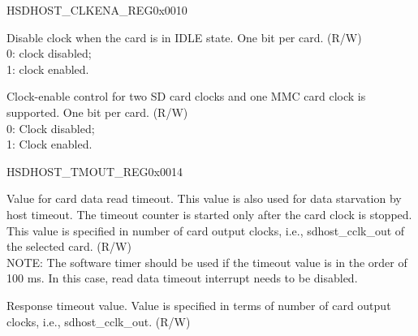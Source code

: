 \begin{register}{H}{SDHOST\_CLKENA\_REG}{0x{}0010}\label{regdesc:CLKENAREG}
%
%
%
%
\regnewline%
\begin{regdesc}\begin{reglist}
\item [SDHOST\_LP\_ENABLE] Disable clock when the card is in IDLE state. One bit per card. (R/W)\\
0: clock disabled;\\
1: clock enabled.
\item [SDHOST\_CCLK\_ENABLE] Clock-enable control for two SD card clocks and one MMC card clock is supported. One bit per card. (R/W)\\
0: Clock disabled;\\
1: Clock enabled.
\end{reglist}\end{regdesc}
\end{register}


\begin{register}{H}{SDHOST\_TMOUT\_REG}{0x{}0014}\label{regdesc:TMOUTREG}
%
%
\regnewline%
\begin{regdesc}\begin{reglist}
\item [SDHOST\_DATA\_TIMEOUT]Value for card data read timeout. This value is also used for data starvation by host timeout. The timeout counter is started only after the card clock is stopped. This value is specified in number of card output clocks, i.e., sdhost\_cclk\_out of the selected card. (R/W)\\
NOTE: The software timer should be used if the timeout value is in the order of 100 ms. In this case, read data timeout interrupt needs to be disabled.
\item [SDHOST\_RESPONSE\_TIMEOUT]Response timeout value. Value is specified in terms of number of card output clocks, i.e., sdhost\_cclk\_out. (R/W)
\end{reglist}\end{regdesc}
\end{register}


